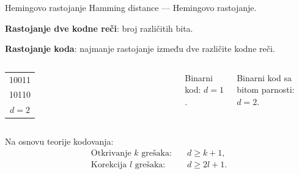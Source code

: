 \begin{frame}[label=06-s026]{Hemingovo rastojanje}
Hamming distance — Hemingovo rastojanje.\par\medskip
\textbf{Rastojanje dve kodne reči}: broj različitih bita.
\par\medskip
\textbf{Rastojanje koda}: najmanje rastojanje između dve različite kodne reči.
\medskip
\begin{columns}[c,onlytextwidth]
\centering
\begin{tabular}{c}10\textcolor{DEcrvena}{0}1\textcolor{DEcrvena}{1}\\[1mm]10\textcolor{DEcrvena}{1}1\textcolor{DEcrvena}{0}\\[2mm]$d=2$\end{tabular}
Binarni kod: $d=1$.\par\medskip
Binarni kod sa bitom parnosti: $d=2$.
\end{columns}\bigskip
Na osnovu teorije kodovanja:
\[\begin{aligned}\text{Otkrivanje }k\text{ grešaka:}\quad&d\ge k+1,\\[2mm]\text{Korekcija }l\text{ grešaka:}\quad&d\ge2l+1.\end{aligned}\]
\end{frame}
